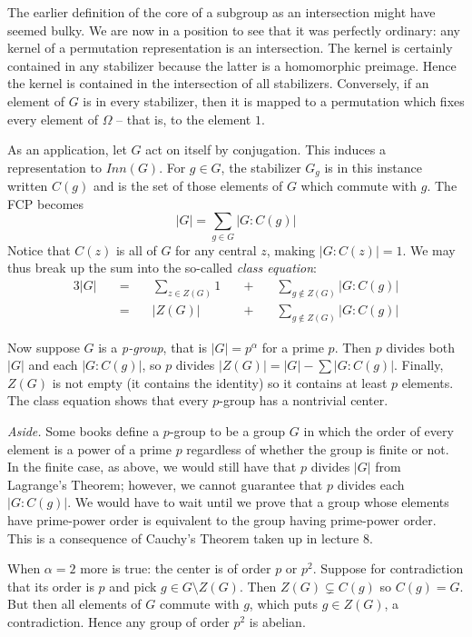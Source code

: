 \documentclass[letterpaper]{article}
\begin{document}
The earlier definition of the core of a subgroup as an intersection might have seemed bulky. We are now in a position to see that it was perfectly ordinary: any kernel of a permutation representation is an intersection. The kernel is certainly contained in any stabilizer because the latter is a homomorphic preimage. Hence the kernel is contained in the intersection of all stabilizers. Conversely, if an element of $G$ is in every stabilizer, then it is mapped to a permutation which fixes every element of $\Omega$ -- that is, to the element $1$.

As an application, let $G$ act on itself by conjugation. This induces a representation to $Inn(G)$. For $g \in G$, the stabilizer $G_g$ is in this instance written $C(g)$ and is the set of those elements of $G$ which commute with $g$. The FCP becomes
\[|G| = \sum_{g \in G} |G \colon C(g)|\]
Notice that $C(z)$ is all of $G$ for any central $z$, making $|G \colon C(z)| = 1$. We may thus break up the sum into the so-called \emph{class equation}:
\begin{alignat*}{3}
|G| \quad &=& \quad \sum_{z \in Z(G)} 1 \quad &+& \quad \sum_{g \not \in Z(G)} |G \colon C(g)| \\
    &=& \quad |Z(G)|              \quad &+& \quad \sum_{g \not \in Z(G)} |G \colon C(g)|
\end{alignat*}

Now suppose $G$ is a \emph{\emph{p}-group}, that is $|G| = p^\alpha$ for a prime $p$. Then $p$ divides both $|G|$ and each $|G \colon C(g)|$, so $p$ divides $|Z(G)| = |G| - \sum |G \colon C(g)|$. Finally, $Z(G)$ is not empty (it contains the identity) so it contains at least $p$ elements. The class equation shows that every $p$-group has a nontrivial center.

\textit{Aside.} Some books define a $p$-group to be a group $G$ in which the order of every element is a power of a prime $p$ regardless of whether the group is finite or not. In the finite case, as above, we would still have that $p$ divides $|G|$ from Lagrange's Theorem; however, we cannot guarantee that $p$ divides each $|G \colon C(g)|$. We would have to wait until we prove that a group whose elements have prime-power order is equivalent to the group having prime-power order. This is a consequence of Cauchy's Theorem taken up in lecture 8.

When $\alpha = 2$ more is true: the center is of order $p$ or $p^2$. Suppose for contradiction that its order is $p$ and pick $g \in G \setminus Z(G)$. Then $Z(G) \subsetneq C(g)$ so $C(g) = G$. But then all elements of $G$ commute with $g$, which puts $g \in Z(G)$, a contradiction. Hence any group of order $p^2$ is abelian.
\end{document}
